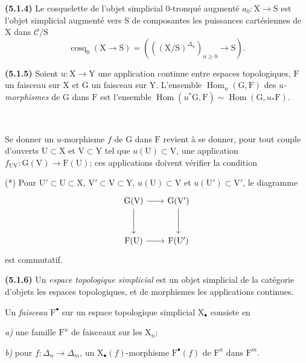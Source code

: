 \documentclass[11pt,leqno]{article}
\newcommand{\Page}[1]{\ifvmode\noindent\else\unskip\ \fi{\footnotesize\textcolor{gray}{[p.\,#1]}}\ \ignorespaces}
\begin{document}
\textbf{(5.1.4)} Le cosquelette de l’objet simplicial 0-tronqué augmenté \(a_0:\mathrm{X}\to\mathrm{S}\) est l’objet simplicial augmenté vers \(\mathrm{S}\) de composantes les puissances cartésiennes de \(\mathrm{X}\) dans \(\mathscr{C}/\mathrm{S}\)
\[
\operatorname{cosq}_0(\mathrm{X}\to\mathrm{S})
=(((\mathrm{X}/\mathrm{S})^{\Delta_n})_{n\geq0}\to\mathrm{S}).
\]

\textbf{(5.1.5)} Soient \(u:\mathrm{X}\to\mathrm{Y}\) une application continue entre espaces topologiques, \(\mathrm{F}\) un faisceau sur \(\mathrm{X}\) et \(\mathrm{G}\) un faisceau sur \(\mathrm{Y}\). L’ensemble \(\operatorname{Hom}_u(\mathrm{G},\mathrm{F})\) des \textit{\(u\)-morphismes} de \(\mathrm{G}\) dans \(\mathrm{F}\) est l’ensemble \(\operatorname{Hom}(u^*\mathrm{G},\mathrm{F})\sim\operatorname{Hom}(\mathrm{G},u_*\mathrm{F})\).

\Page{10}

Se donner un \(u\)-morphisme \(f\) de \(\mathrm{G}\) dans \(\mathrm{F}\) revient à se donner, pour tout couple d’ouverts \(\mathrm{U}\subset\mathrm{X}\) et \(\mathrm{V}\subset\mathrm{Y}\) tel que \(u(\mathrm{U})\subset\mathrm{V}\), une application \(f_{\mathrm{UV}}:\mathrm{G}(\mathrm{V})\to\mathrm{F}(\mathrm{U})\); ces applications doivent vérifier la condition

\noindent (*) Pour \(\mathrm{U}'\subset\mathrm{U}\subset\mathrm{X}\), \(\mathrm{V}'\subset\mathrm{V}\subset\mathrm{Y}\), \(u(\mathrm{U})\subset\mathrm{V}\) et \(u(\mathrm{U}')\subset\mathrm{V}'\), le diagramme
\[
\begin{tikzcd}[column sep=2em, row sep=3em]
\mathrm{G}(\mathrm{V}) \arrow[r] \arrow[d]
  & \mathrm{G}(\mathrm{V}') \arrow[d] \\
\mathrm{F}(\mathrm{U}) \arrow[r]
  & \mathrm{F}(\mathrm{U}')
\end{tikzcd}
\]
est commutatif.

\textbf{(5.1.6)} Un \textit{espace topologique simplicial} est un objet simplicial de la catégorie d’objets les espaces topologiques, et de morphismes les applications continues.

Un \textit{faisceau} \(\mathrm{F}^{\bullet}\) sur un espace topologique simplicial \(\mathrm{X}_{\bullet}\) consiste en

\noindent\textit{a)} une famille \(\mathrm{F}^n\) de faisceaux sur les \(\mathrm{X}_n\);\par
\noindent\textit{b)} pour \(f:\Delta_n\to\Delta_m\), un \(\mathrm{X}_{\bullet}(f)\)-morphisme \(\mathrm{F}^{\bullet}(f)\) de \(\mathrm{F}^n\) dans \(\mathrm{F}^m\).\par
\end{document}
